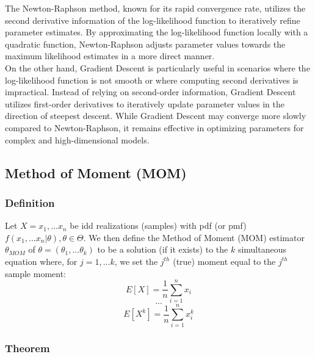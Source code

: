 \documentclass[12pt]{article}
\begin{document}
	The Newton-Raphson method, known for its rapid convergence rate, utilizes the second derivative information of the log-likelihood function to iteratively refine parameter estimates. By approximating the log-likelihood function locally with a quadratic function, Newton-Raphson adjusts parameter values towards the maximum likelihood estimates in a more direct manner.
	\\

	On the other hand, Gradient Descent is particularly useful in scenarios where the log-likelihood function is not smooth or where computing second derivatives is impractical. Instead of relying on second-order information, Gradient Descent utilizes first-order derivatives to iteratively update parameter values in the direction of steepest descent. While Gradient Descent may converge more slowly compared to Newton-Raphson, it remains effective in optimizing parameters for complex and high-dimensional models.

	\subsection{Method of Moment (MOM)}
	\subsubsection{Definition}
		Let $X = {x_{1},...x_{n}}$ be idd realizations (samples) with pdf (or pmf) $f(x_{1},...x_{n}|\theta), \theta \in \Theta$. We then define the Method of Moment (MOM) estimator $\theta_{MOM}$ of $\theta = (\theta_{1},...\theta_{k})$ to be a solution (if it exists) to the $k$ simultaneous equation where, for $ j = 1,...k$, we set the $j^{th}$ (true) moment equal to the $j^{th}$ sample moment:
		$$E[X]=\frac{1}{n}\sum_{i=1}^{n} x_{i}$$
		$$...$$
		$$E[X^{k}]=\frac{1}{n}\sum_{i=1}^{n} x^{k}_{i}$$

	\subsubsection{Theorem}
	
\end{document}
